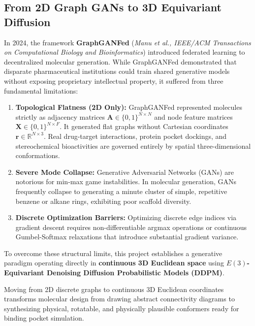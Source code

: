 \documentclass[11pt, a4paper]{article}
\begin{document}
\subsection{From 2D Graph GANs to 3D Equivariant Diffusion}
In 2024, the framework \textbf{GraphGANFed} (\textit{Manu et al., IEEE/ACM Transactions on Computational Biology and Bioinformatics}) introduced federated learning to decentralized molecular generation. While GraphGANFed demonstrated that disparate pharmaceutical institutions could train shared generative models without exposing proprietary intellectual property, it suffered from three fundamental limitations:
\begin{enumerate}
    \item \textbf{Topological Flatness (2D Only):} GraphGANFed represented molecules strictly as adjacency matrices $\bm{A} \in \{0, 1\}^{N \times N}$ and node feature matrices $\bm{X} \in \{0, 1\}^{N \times F}$. It generated flat graphs without Cartesian coordinates $\bm{r} \in \mathbb{R}^{N \times 3}$. Real drug-target interactions, protein pocket dockings, and stereochemical bioactivities are governed entirely by spatial three-dimensional conformations.
    \item \textbf{Severe Mode Collapse:} Generative Adversarial Networks (GANs) are notorious for min-max game instabilities. In molecular generation, GANs frequently collapse to generating a minute cluster of simple, repetitive benzene or alkane rings, exhibiting poor scaffold diversity.
    \item \textbf{Discrete Optimization Barriers:} Optimizing discrete edge indices via gradient descent requires non-differentiable argmax operations or continuous Gumbel-Softmax relaxations that introduce substantial gradient variance.
\end{enumerate}

To overcome these structural limits, this project establishes a generative paradigm operating directly in \textbf{continuous 3D Euclidean space} using \textbf{$E(3)$-Equivariant Denoising Diffusion Probabilistic Models (DDPM)}.

\begin{takeaway}
Moving from 2D discrete graphs to continuous 3D Euclidean coordinates transforms molecular design from drawing abstract connectivity diagrams to synthesizing physical, rotatable, and physically plausible conformers ready for binding pocket simulation.
\end{takeaway}
\end{document}
